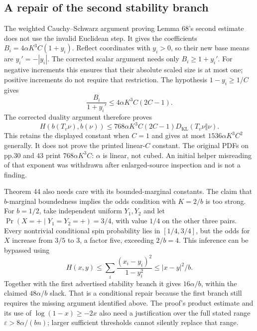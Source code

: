 \documentclass[10pt]{article}
\begin{document}
\subsection*{A repair of the second stability branch}
The weighted Cauchy–Schwarz argument proving Lemma 68’s second estimate does not use the invalid Euclidean step. It gives the coefficients \(B_i=4\alpha K^3C(1+y_i)\). Reflect coordinates with \(y_i>0\), so their new base means are \(y_i'=-|y_i|\). The corrected scalar argument needs only \(B_i\ge1+y_i'\). For negative increments this ensures that their absolute scaled size is at most one; positive increments do not require that restriction. The hypothesis \(1-y_i\ge1/C\) gives \[\frac{B_i}{1+y_i'}\le4\alpha K^3C(2C-1).\] The corrected duality argument therefore proves \[H(b(T_v\nu),b(\nu))
 \le768\alpha K^3C(2C-1)D_{\mathrm{KL}}(T_v\nu\Vert\nu).\] This retains the displayed constant when \(C=1\) and gives at most \(1536\alpha K^3C^2\) generally. It does not prove the printed linear-\(C\) constant. The original PDFs on pp.30 and 43 print \(768\alpha K^3C\): \(\alpha\) is linear, not cubed. An initial helper misreading of that exponent was withdrawn after enlarged-source inspection and is not a finding.\par
Theorem 44 also needs care with its bounded-marginal constants. The claim that \(b\)-marginal boundedness implies the odds condition with \(K=2/b\) is too strong. For \(b=1/2\), take independent uniform \(Y_1,Y_2\) and let \(\Pr(X=+\mid Y_1=Y_2=+)=3/4\), with value \(1/4\) on the other three pairs. Every nontrivial conditional spin probability lies in \([1/4,3/4]\), but the odds for \(X\) increase from \(3/5\) to \(3\), a factor five, exceeding \(2/b=4\). This inference can be bypassed using \[H(x,y)\le\sum_i\frac{(x_i-y_i)^2}{1-y_i^2}
       \le |x-y|^2/b.\] Together with the first advertised stability branch it gives \(16\alpha/b\), within the claimed \(48\alpha/b\) slack. That is a conditional repair because the first branch still requires the missing argument identified above. The proof’s product estimate and its use of \(\log(1-x)\ge-2x\) also need a justification over the full stated range \(\varepsilon>8\alpha/(bn)\); larger sufficient thresholds cannot silently replace that range.\par
\end{document}
